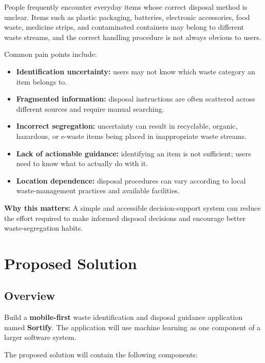 \documentclass[11pt,a4paper]{article}
\begin{document}
People frequently encounter everyday items whose correct disposal method is unclear. Items such as plastic packaging, batteries, electronic accessories, food waste, medicine strips, and contaminated containers may belong to different waste streams, and the correct handling procedure is not always obvious to users.

Common pain points include:

\begin{itemize}[leftmargin=0.7cm]
    \item \textbf{Identification uncertainty:} users may not know which waste category an item belongs to.
    \item \textbf{Fragmented information:} disposal instructions are often scattered across different sources and require manual searching.
    \item \textbf{Incorrect segregation:} uncertainty can result in recyclable, organic, hazardous, or e-waste items being placed in inappropriate waste streams.
    \item \textbf{Lack of actionable guidance:} identifying an item is not sufficient; users need to know what to actually do with it.
    \item \textbf{Location dependence:} disposal procedures can vary according to local waste-management practices and available facilities.
\end{itemize}

\textbf{Why this matters:} A simple and accessible decision-support system can reduce the effort required to make informed disposal decisions and encourage better waste-segregation habits.

\section{Proposed Solution}

\subsection{Overview}

Build a \textbf{mobile-first} waste identification and disposal guidance application named \textbf{Sortify}. The application will use machine learning as one component of a larger software system.

The proposed solution will contain the following components:
\end{document}

